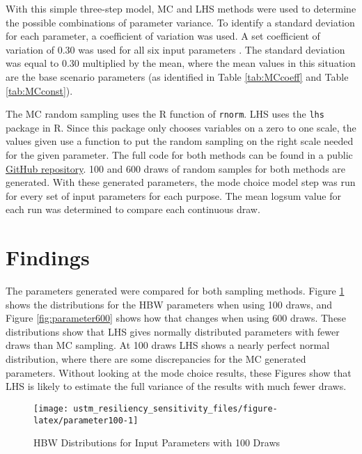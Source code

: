 \documentclass[3p, authoryear, review]{elsarticle} %
\begin{document}
With this simple three-step model, MC and LHS methods were used to determine the possible combinations of parameter variance. To identify a standard deviation for each parameter, a coefficient of variation was used. A set coefficient of variation of 0.30 was used for all six input parameters \citep{zhao2002propagation}. The standard deviation was equal to 0.30 multiplied by the mean, where the mean values in this situation are the base scenario parameters (as identified in Table \ref{tab:MCcoeff} and Table \ref{tab:MCconst}).

The MC random sampling uses the R function of \texttt{rnorm}. LHS uses the \texttt{lhs} package in R. Since this package only chooses variables on a zero to one scale, the values given use a function to put the random sampling on the right scale needed for the given parameter. The full code for both methods can be found in a public
\href{https://github.com/natmaegray/ustm_resiliency_sensitivity}{GitHub repository}. 100 and 600 draws of random samples for both methods are generated. With these generated parameters, the mode choice model step was run for every set of input parameters for each purpose. The mean logsum value for each run was determined to compare each continuous draw.

\hypertarget{findings}{%
\section{Findings}\label{findings}}

The parameters generated were compared for both sampling methods. Figure \ref{fig:parameter100} shows the distributions for the HBW parameters when using 100 draws, and Figure \ref{fig:parameter600} shows how that changes when using 600 draws. These distributions show that LHS gives normally distributed parameters with fewer draws than MC sampling. At 100 draws LHS shows a nearly perfect normal distribution, where there are some discrepancies for the MC generated parameters. Without looking at the mode choice results, these Figures show that LHS is likely to estimate the full variance of the results with much fewer draws.

\begin{figure}

{\centering \texttt{[image: ustm\_resiliency\_sensitivity\_files/figure-latex/parameter100-1]} 

}

\caption{HBW Distributions for Input Parameters with 100 Draws}\label{fig:parameter100}
\end{figure}
\end{document}

